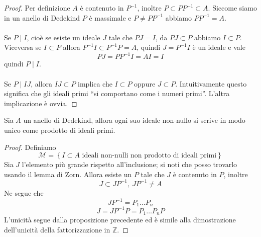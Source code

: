 \begin{proof}
	Per definizione $A$ è contenuto in $P^{-1}$, inoltre $P\subset PP^{-1}\subset A$. Siccome siamo in un anello di Dedekind $P$ è massimale e $P\neq PP^{-1}$ abbiamo $PP^{-1}=A$. \\ \\ 
	Se $P \mid I$, cioè se esiste un ideale $J$ tale che $PJ=I$, da $PJ\subset P$ abbiamo $I\subset P$. Viceversa se $I\subset P$ allora $P^{-1}I\subset P^{-1}P=A$, quindi $J=P^{-1}I$ è un ideale e vale 
	\begin{equation*}
	PJ=PP^{-1}I=AI=I
	\end{equation*}
	quindi $P\mid I$. \\ \\
	Se $P\mid IJ$, allora $IJ\subset P$ implica che $I\subset P$ oppure $J\subset P$. Intuitivamente questo significa che gli ideali primi \enquote{si comportano come i numeri primi}. L'altra implicazione è ovvia.
\end{proof}
\begin{teorema}
	Sia $A$ un anello di Dedekind, allora ogni suo ideale non-nullo si scrive in modo unico come prodotto di ideali primi.
\end{teorema}
\begin{proof}
	Definiamo
	\begin{equation*}
	\mathcal{M}=\left\{I\subset A \text{ ideali non-nulli non prodotto di ideali primi}\right\}
	\end{equation*}
	Sia $J$ l'elemento più grande rispetto all'inclusione; si noti che posso trovarlo usando il lemma di Zorn. Allora esiste un $P$ tale che $J$ è contenuto in $P$, inoltre
	\begin{equation*}
	J\subset JP^{-1}, \ JP^{-1}\neq A
	\end{equation*}
	Ne segue che 
	\begin{equation*}
	JP^{-1}=P_1\dots P_n
	\end{equation*}
	\begin{equation*}
	J=JP^{-1}P=P_1\dots P_nP
	\end{equation*}
	L'unicità segue dalla proposizione precedente ed è simile alla dimostrazione dell'unicità della fattorizzazione in $\mathbb{Z}$.
\end{proof}
